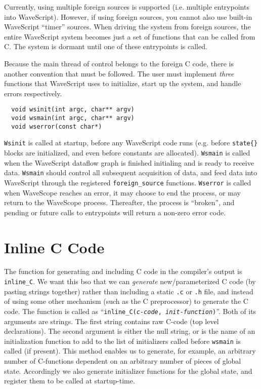 Currently, using multiple foreign sources is supported (i.e. multiple
entrypoints into WaveScript).  However, if using foreign sources, you
cannot also use built-in WaveScript ``timer'' sources.  When driving
the system from foreign sources, the entire WaveScript system becomes
just a set of functions that can be called from C.  The system is
dormant until one of these entrypoints is called.

Because the main thread of control belongs to the foreign C code,
there is another convention that must be followed.  The user must implement
{\em three} functions that WaveScript uses to initialize, start up the
system, and handle errors respectively.

\begin{verbatim}
  void wsinit(int argc, char** argv)
  void wsmain(int argc, char** argv)
  void wserror(const char*)
\end{verbatim}

{\tt Wsinit} is called at startup, before any WaveScript code runs
(e.g. before {\tt state\{\}} blocks are initialized, and even before
constants are allocated).  {\tt Wsmain} is called when the WaveScript
dataflow graph is finished initialing and is ready to receive data.
{\tt Wsmain} should control all subsequent acquisition of data, and
feed data into WaveScript through the registered {\tt foreign\_source}
functions.  {\tt Wserror} is called when WaveScope reaches an error,
it may choose to end the process, or may return to the WaveScope
process.  Thereafter, the process is ``broken'', and pending or future
calls to entrypoints will return a non-zero error code.

\section{Inline C Code}

The function for generating and including C code in the compiler's
output is {\tt inline\_C}.  We want this bso that we can
{\em generate} new/parameterized C code (by pasting strings together) rather than 
including a static {\tt .c} or {\tt .h} file, and instead of using
some other mechanism (such as the C preprocessor) to generate the C code.
The function  is called as ``{\tt inline\_C({\em c-code},
{\em init-function})}''.  Both of its arguments are strings.  The first
string contains raw C-code (top level declarations).  The second
argument is either the null string, or is the name of an
initialization function to add to the list of initializers called
before {\tt wsmain} is called (if present).  This method enables us to
generate, for example, an arbitrary number of C-functions dependent on
an arbitrary number of pieces of global state.  Accordingly we also
generate initializer functions for the global state, and register them
to be called at startup-time.

